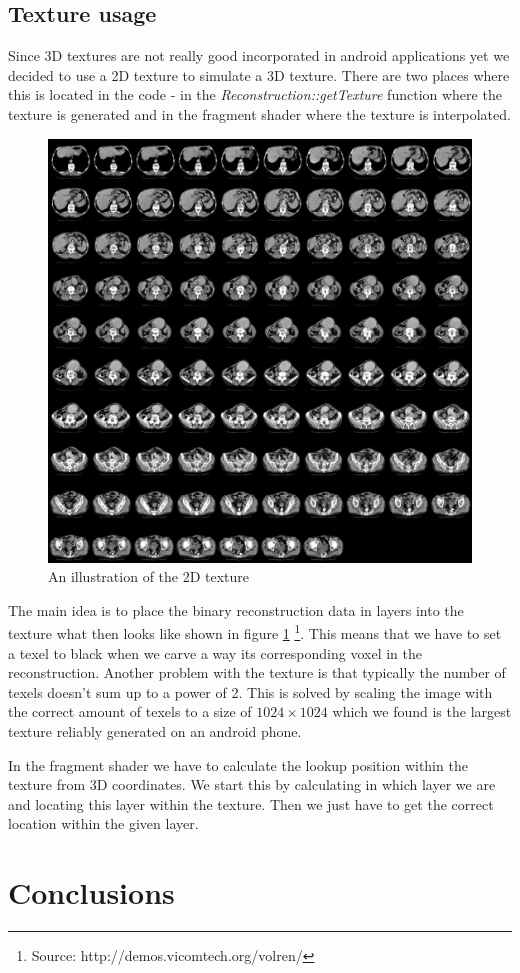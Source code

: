 \documentclass[10pt,twocolumn,letterpaper]{article}
\begin{document}
\subsection{Texture usage}

Since 3D textures are not really good incorporated in android applications yet we decided to use a 2D texture to simulate a 3D texture. There are two places where this is located in the code - in the \emph{Reconstruction::getTexture} function where the texture is generated and in the fragment shader where the texture is interpolated.

\begin{figure}[h]
	\begin{center}
		\includegraphics[width=0.4\linewidth]{./texture.jpg}
		\caption{An illustration of the 2D texture}
		\label{fig:texture}
	\end{center}
\end{figure}
The main idea is to place the binary reconstruction data in layers into the texture what then looks like shown in figure \ref{fig:texture} \footnote{Source: http://demos.vicomtech.org/volren/}. This means that we have to set a texel to black when we carve a way its corresponding voxel in the reconstruction. Another problem with the texture is that typically the number of texels doesn't sum up to a power of 2. This is solved by scaling the image with the correct amount of texels to a size of $1024 \times 1024$ which we found is the largest texture reliably generated on an android phone.

In the fragment shader we have to calculate the lookup position within the texture from 3D coordinates. We start this by calculating in which layer we are and locating this layer within the texture. Then we just have to get the correct location within the given layer.

\section{Conclusions}
\end{document}
